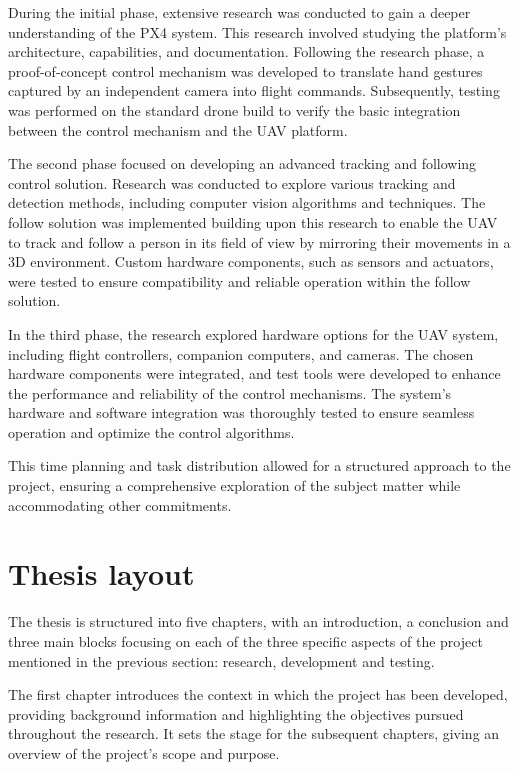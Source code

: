 During the initial phase, extensive research was conducted to gain a deeper understanding of the PX4 system. This research involved studying the platform's architecture, capabilities, and documentation. Following the research phase, a proof-of-concept control mechanism was developed to translate hand gestures captured by an independent camera into flight commands. Subsequently, testing was performed on the standard drone build to verify the basic integration between the control mechanism and the UAV platform.

The second phase focused on developing an advanced tracking and following control solution. Research was conducted to explore various tracking and detection methods, including computer vision algorithms and techniques. The follow solution was implemented building upon this research to enable the UAV to track and follow a person in its field of view by mirroring their movements in a 3D environment. Custom hardware components, such as sensors and actuators, were tested to ensure compatibility and reliable operation within the follow solution.

In the third phase, the research explored hardware options for the UAV system, including flight controllers, companion computers, and cameras. The chosen hardware components were integrated, and test tools were developed to enhance the performance and reliability of the control mechanisms. The system's hardware and software integration was thoroughly tested to ensure seamless operation and optimize the control algorithms.


This time planning and task distribution allowed for a structured approach to the project, ensuring a comprehensive exploration of the subject matter while accommodating other commitments.

\section{Thesis layout}
\label{sec:layout}


The thesis is structured into five chapters, with an introduction, a conclusion and three main blocks focusing on each of the three specific aspects of the project mentioned in the previous section: research, development and testing. 

The first chapter introduces the context in which the project has been developed, providing background information and highlighting the objectives pursued throughout the research. It sets the stage for the subsequent chapters, giving an overview of the project's scope and purpose.

